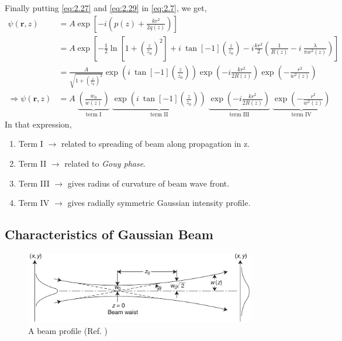 \documentclass[11pt,a4paper]{article}
\numberwithin{equation}{section}
\begin{document}
Finally putting \ref{eq:2.27} and \ref{eq:2.29} in \ref{eq:2.7}, we get,\cite{kogelnik 66}\cite{cornell}
\begin{align}
	\psi(\boldsymbol{r},z)&= A\exp\left[-i\left(p(z) + \frac{kr^2}{2q(z)}\right)\right]\nonumber\\
	&= A\exp\left[- \frac{1}{2}\ln\left[1+ \left(\frac{z}{z_0}\right)^2\right]+i\: \tan[-1](\frac{z}{z_0}) -i \frac{kr^2}{2}\left(\frac{1}{R(z)} - i\: \frac{\lambda}{\pi w^2(z)}\right) \right]\nonumber\\
	&=\frac{A}{\sqrt{1+ \left(\frac{z}{z_0}\right)^2}} \exp(i\:\tan[-1](\frac{z}{z_0})) \exp(-i\frac{kr^2}{2R(z)}) \exp(-\frac{r^2}{w^2(z)}) \nonumber\\
	\Rightarrow \psi(\boldsymbol{r},z)&=A\; 
	\underbrace{\left(\frac{w_0}{w(z)}\right)}_{\text{term I}}\;
	\underbrace{\exp(i{\:}\tan[-1](\frac{z}{z_0}))}_{\text{term II}}\; \underbrace{\exp(-i\frac{kr^2}{2R(z)})}_{\text{term III}}\;
	\underbrace{\exp(-\frac{r^2}{w^2(z)})}_{\text{term IV}} \label{eq:2.30}
\end{align} 
In that expression,
\begin{enumerate}
	\item Term I $\longrightarrow$ related to spreading of beam along propagation in z.
	\item Term II $\longrightarrow$ related to \textit{Gouy phase}.
	\item Term III $\longrightarrow$ gives radius of curvature of beam wave front.
	\item Term IV $\longrightarrow$ gives radially symmetric Gaussian intensity profile.
	
\end{enumerate}


\subsection{Characteristics of Gaussian Beam }
\begin{figure}[H]
	\centering
	\includegraphics[width=0.90\textwidth]{beam.png}
	\caption{A beam profile (Ref. \cite{milonni})}
	\label{fig:beam}
\end{figure}
\end{document}
